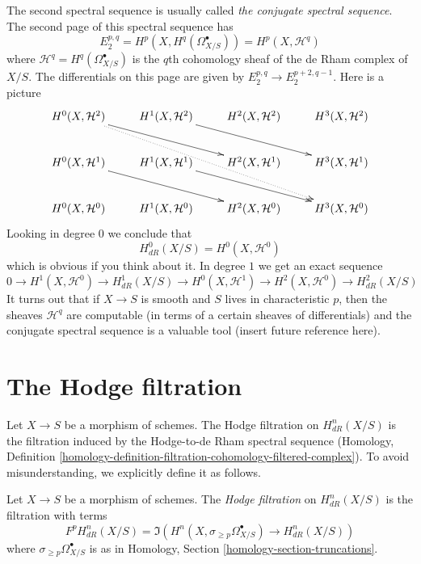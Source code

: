\medskip\noindent
The second spectral sequence is usually called
{\it the conjugate spectral sequence}. The second page of this
spectral sequence has
$$
E_2^{p, q} = H^p(X, H^q(\Omega^\bullet_{X/S})) = H^p(X, \mathcal{H}^q)
$$
where $\mathcal{H}^q = H^q(\Omega^\bullet_{X/S})$ is the $q$th
cohomology sheaf of the de Rham complex of $X/S$. The differentials
on this page are given by $E_2^{p, q} \to E_2^{p + 2, q - 1}$.
Here is a picture
$$
\xymatrix{
H^0(X, \mathcal{H}^2) \ar[rrd] \ar@{..>}[rrrdd] &
H^1(X, \mathcal{H}^2) \ar[rrd] &
H^2(X, \mathcal{H}^2) &
H^3(X, \mathcal{H}^2) \\
H^0(X, \mathcal{H}^1) \ar[rrd] &
H^1(X, \mathcal{H}^1) \ar[rrd] &
H^2(X, \mathcal{H}^1) &
H^3(X, \mathcal{H}^1) \\
H^0(X, \mathcal{H}^0) &
H^1(X, \mathcal{H}^0) &
H^2(X, \mathcal{H}^0) &
H^3(X, \mathcal{H}^0)
}
$$
Looking in degree $0$ we conclude that
$$
H^0_{dR}(X/S) = H^0(X, \mathcal{H}^0)
$$
which is obvious if you think about it. In degree $1$ we get an exact sequence
$$
0 \to H^1(X, \mathcal{H}^0) \to H^1_{dR}(X/S) \to
H^0(X, \mathcal{H}^1) \to H^2(X, \mathcal{H}^0) \to H^2_{dR}(X/S)
$$
It turns out that if $X \to S$ is smooth and $S$ lives in characteristic $p$,
then the sheaves $\mathcal{H}^q$ are computable (in terms of a certain
sheaves of differentials) and the conjugate spectral sequence is a valuable
tool (insert future reference here).



\section{The Hodge filtration}
\label{section-hodge-filtration}

\noindent
Let $X \to S$ be a morphism of schemes. The Hodge filtration on $H^n_{dR}(X/S)$
is the filtration induced by the Hodge-to-de Rham spectral sequence
(Homology, Definition
\ref{homology-definition-filtration-cohomology-filtered-complex}).
To avoid misunderstanding, we explicitly define it as follows.

\begin{definition}
\label{definition-hodge-filtration}
Let $X \to S$ be a morphism of schemes. The {\it Hodge filtration}
on $H^n_{dR}(X/S)$ is the filtration with terms
$$
F^pH^n_{dR}(X/S) = \Im\left(H^n(X, \sigma_{\geq p}\Omega^\bullet_{X/S})
\longrightarrow H^n_{dR}(X/S)\right)
$$
where $\sigma_{\geq p}\Omega^\bullet_{X/S}$ is as in
Homology, Section \ref{homology-section-truncations}.
\end{definition}

